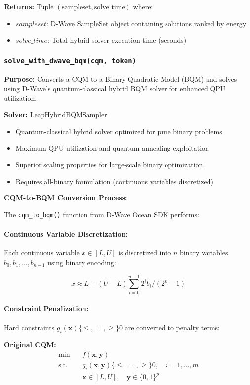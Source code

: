 \documentclass{article}
\begin{document}
\textbf{Returns:} Tuple $(\text{sampleset}, \text{solve\_time})$ where:
\begin{itemize}
    \item $sampleset$: D-Wave SampleSet object containing solutions ranked by energy
    \item $solve\_time$: Total hybrid solver execution time (seconds)
\end{itemize}

\subsubsection{\texttt{solve\_with\_dwave\_bqm(cqm, token)}}

\textbf{Purpose:} Converts a CQM to a Binary Quadratic Model (BQM) and solves using D-Wave's quantum-classical hybrid BQM solver for enhanced QPU utilization.

\textbf{Solver:} LeapHybridBQMSampler
\begin{itemize}
    \item Quantum-classical hybrid solver optimized for pure binary problems
    \item Maximum QPU utilization and quantum annealing exploitation
    \item Superior scaling properties for large-scale binary optimization
    \item Requires all-binary formulation (continuous variables discretized)
\end{itemize}

\textbf{CQM-to-BQM Conversion Process:}

The \texttt{cqm\_to\_bqm()} function from D-Wave Ocean SDK performs:

\paragraph{Continuous Variable Discretization:} Each continuous variable $x \in [L, U]$ is discretized into $n$ binary variables $b_0, b_1, \ldots, b_{n-1}$ using binary encoding:

$$x \approx L + (U - L) \sum_{i=0}^{n-1} 2^i b_i \Big/ (2^n - 1)$$

\paragraph{Constraint Penalization:} Hard constraints $g_i(\mathbf{x}) \{\leq, =, \geq\} 0$ are converted to penalty terms:

\textbf{Original CQM:}
\begin{align*}
\min \quad & f(\mathbf{x}, \mathbf{y}) \\
\text{s.t.} \quad & g_i(\mathbf{x}, \mathbf{y}) \{\leq, =, \geq\} 0, \quad i = 1, \ldots, m \\
& \mathbf{x} \in [L, U], \quad \mathbf{y} \in \{0,1\}^p
\end{align*}
\end{document}
